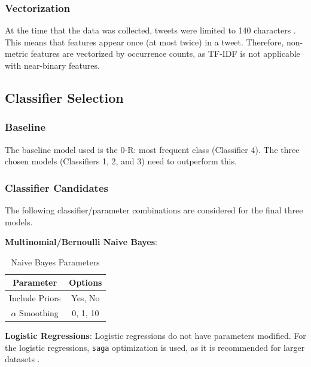 \documentclass[11pt]{article}
\begin{document}
\subsubsection{Vectorization}\label{sec:vectorization}

At the time that the data was collected, tweets were limited to 140 characters \cite{tweetlen}.
This means that features appear once (at most twice) in a tweet.
Therefore, non-metric features are vectorized by occurrence counts, 
as TF-IDF is not applicable with near-binary features. 

\subsection{Classifier Selection}

\subsubsection{Baseline}

The baseline model used is the 0-R: most frequent class (Classifier 4).
The three chosen models (Classifiers 1, 2, and 3) need to outperform this.

\subsubsection{Classifier Candidates}\label{sec:allcandidates}

The following classifier/parameter combinations are considered for the final three models. 

\textbf{Multinomial/Bernoulli Naive Bayes}:
\begin{table}[h]
	\begin{center}
		\begin{tabular}{|c|c|}			
			\hline
			Parameter & Options \\
			\hline
			Include Priors & Yes, No \\
			$\alpha$ Smoothing & 0, 1, 10 \\
			\hline
		\end{tabular}
		\caption{Naive Bayes Parameters}
		\label{tbl:nb-options}
	\end{center}
\end{table}

\textbf{Logistic Regressions}:
Logistic regressions do not have parameters modified.
For the logistic regressions, \texttt{saga} optimization is used, as it is recommended for larger datasets \cite{skl}.
\end{document}
